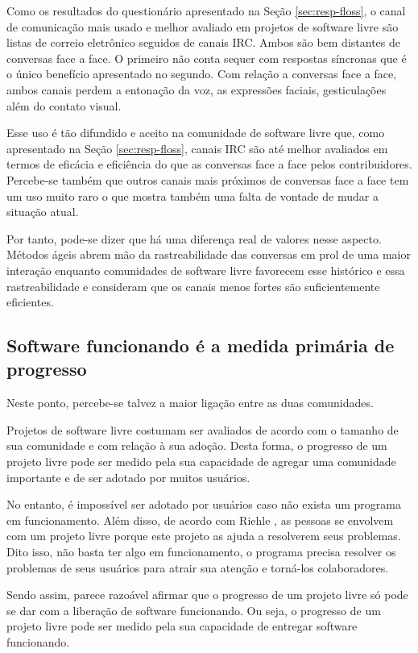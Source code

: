 Como os resultados do questionário apresentado na Seção
\ref{sec:resp-floss}, o canal de comunicação mais usado e melhor
avaliado em projetos de software livre são listas de correio
eletrônico seguidos de canais IRC. Ambos são bem distantes de
conversas face a face. O primeiro não conta sequer com respostas
síncronas que é o único benefício apresentado no segundo. Com relação
a conversas face a face, ambos canais perdem a entonação da voz, as
expressões faciais, gesticulações além do contato visual.

Esse uso é tão difundido e aceito na comunidade de software livre que,
como apresentado na Seção \ref{sec:resp-floss}, canais IRC são até
melhor avaliados em termos de eficácia e eficiência do que as
conversas face a face pelos contribuidores. Percebe-se também que
outros canais mais próximos de conversas face a face tem um uso muito
raro o que mostra também uma falta de vontade de mudar a situação
atual.

Por tanto, pode-se dizer que há uma diferença real de valores nesse
aspecto. Métodos ágeis abrem mão da rastreabilidade das conversas em
prol de uma maior interação enquanto comunidades de software livre
favorecem esse histórico e essa rastreabilidade e consideram que os
canais menos fortes são suficientemente eficientes.

\subsection[Software funcionando]{Software funcionando é a medida
  primária de progresso}

Neste ponto, percebe-se talvez a maior ligação entre as duas
comunidades.

Projetos de software livre costumam ser avaliados de acordo com o
tamanho de sua comunidade e com relação à sua adoção. Desta forma, o
progresso de um projeto livre pode ser medido pela sua capacidade de
agregar uma comunidade importante e de ser adotado por muitos
usuários.

No entanto, é impossível ser adotado por usuários caso não exista um
programa em funcionamento. Além disso, de acordo com Riehle
\cite{Riehle2007}, as pessoas se envolvem com um projeto livre porque
este projeto as ajuda a resolverem seus problemas. Dito isso, não
basta ter algo em funcionamento, o programa precisa resolver os
problemas de seus usuários para atrair sua atenção e torná-los
colaboradores.

Sendo assim, parece razoável afirmar que o progresso de um projeto
livre só pode se dar com a liberação de software funcionando. Ou seja,
o progresso de um projeto livre pode ser medido pela sua capacidade de
entregar software funcionando.

